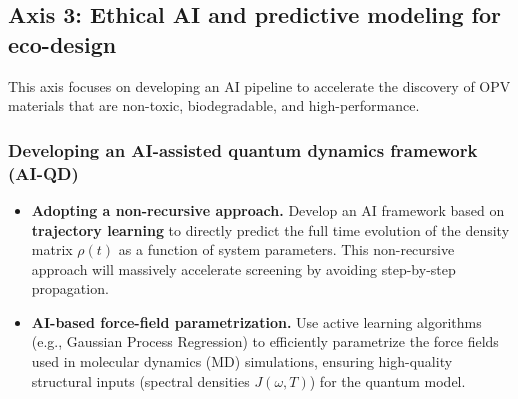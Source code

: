 \documentclass[12pt, a4paper]{article}
\begin{document}
\subsection{Axis 3: Ethical AI and predictive modeling for eco-design}

This axis focuses on developing an AI pipeline to accelerate the discovery of OPV materials that are non-toxic, biodegradable, and high-performance.

\subsubsection{Developing an AI-assisted quantum dynamics framework (AI-QD)}
\begin{itemize}
    \item \textbf{Adopting a non-recursive approach.} Develop an AI framework based on \textbf{trajectory learning} to directly predict the full time evolution of the density matrix $\rho(t)$ as a function of system parameters. This non-recursive approach will massively accelerate screening by avoiding step-by-step propagation.

    \item \textbf{AI-based force-field parametrization.} Use active learning algorithms (e.g., Gaussian Process Regression) to efficiently parametrize the force fields used in molecular dynamics (MD) simulations, ensuring high-quality structural inputs (spectral densities $J(\omega, T)$) for the quantum model.
\end{itemize}
\end{document}
